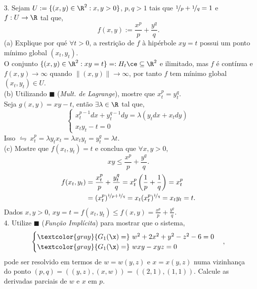 \hspace{-0.1cm}3. Sejam \(U:= \{(x,y) \in \R^2 : x,y >0 \}\), \(p,q >1\) tais que \(\nicefrac{1}{p} + \nicefrac{1}{q} = 1\) e \(f: U \to \R\) tal que, 
\[f(x,y) := \frac{x^p}{p} + \frac{y^q}{q}.\] 
(a) Explique por qué \(\forall t>0\), a restrição de \(f\) à hipérbole \(xy = t\) possui um ponto mínimo global \((x_t, y_t)\). \\ 
\textcolor{gris}{O conjunto \(\{(x,y) \in \R^2 : xy=t\}=: H_t\ce\subseteq \R^2 \) e ilimitado, mas \(f\) é contínua e \(f(x,y) \to \infty\) quando \(\|(x,y)\| \to \infty\), por tanto \(f\) tem mínimo global \((x_t, y_t) \in U\). } \vspace{0.3cm}\\
(b) Utilizando \(\blacksquare\) (\emph{Mult. de Lagrange}), mostre que \(x_t^p = y_t^q\). \\ 
\textcolor{gris}{Seja \(g(x,y) = xy - t\), então \(\exists \lambda \in \R \) tal que,  %
\[ \begin{cases}
        x_t^{p-1}dx + y_t^{q-1}dy = \lambda (y_t dx + x_tdy) \\ 
        x_ty_t  - t = 0
    \end{cases}  \]
Isso \(\leftrightharpoons \ x_t^p = \lambda y_tx_t = \lambda x_ty_t = y_t^q = \lambda t  \).
} \vspace{0.3cm} \\ 
(c) Mostre que \(f(x_t, y_t) = t \) e conclua que \(\forall x,y > 0\), 
\[ xy \leq \frac{x^p}{p} + \frac{y^q}{q}.  \]
\- \vspace{-0.5cm}
\textcolor{gris}{
\begin{align*}
f(x_t, y_t) &=  \frac{x_t^p}{p} + \frac{y_t^q}{q} = x_t^p \left(\frac{1}{p} + \frac{1}{q}\right) = x_t^p\\ 
&= (x_t^p)^{\nicefrac{1}{p} + \nicefrac{1}{q}} = x_t (x_t^{p})^{\nicefrac{1}{q}} = x_ty_t = t. 
\end{align*}
Dados \(x,y > 0\), \(xy = t = f(x_t, y_t) \leq f(x,y) = \frac{x^p}{p} + \frac{y^q}{q}\). 
}\vspace{0.3cm}\\ 
4. Utilize \(\blacksquare\) (\emph{Função Implícita}) para mostrar que o sistema, 
\[\begin{cases}
    \textcolor{gray}{G_1(\x) = } \  w^2 + 2x^2+y^2 - z^2 - 6 = 0 \\ 
    \textcolor{gray}{G_1(\x) = } \  wxy - xyz = 0 
\end{cases}, \]
pode ser resolvido em termos de \(w = w(y,z)\) e \(x = x(y,z)\) numa vizinhança do ponto \((p,q) = ((y,z),(x,w)) = ((2,1),(1,1))\). Calcule as derivadas parciais de \(w\) e \(x\) em \(p\). \\
